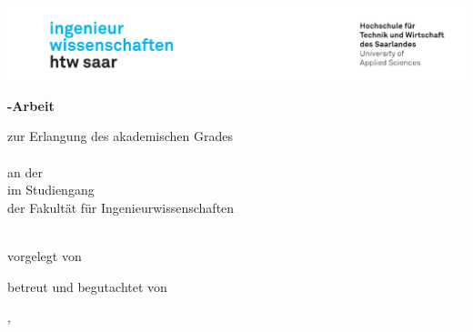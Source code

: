 \begin{titlepage}\linespread{1.5}\selectfont
\includegraphics[width=146mm]{Graphics/htwsaar_Logo_inwi_head_VF_4C_crop}
  \begin{center}
    \large  
    \vfill
    \begingroup
      \Large\bfseries\myDegreeType-Arbeit 
    \endgroup
		
		\bigskip
		
    zur Erlangung des akademischen Grades \\
    \myDegree \\ 
    an der \myUni \\
    im Studiengang \myDegreeCourse \\
    der Fakultät für Ingenieurwissenschaften \\ 
    
  \vfill
	
  \begingroup
    \Large\bfseries\myTitle 
  \endgroup
	
	\bigskip
	
  vorgelegt von \\
  \myName
	
  \vfill
	
  betreut und begutachtet von \\
  \myFirstProf
	
  \vfill
	
  \myLocation, \myTime                   

    \end{center}       
\end{titlepage}   